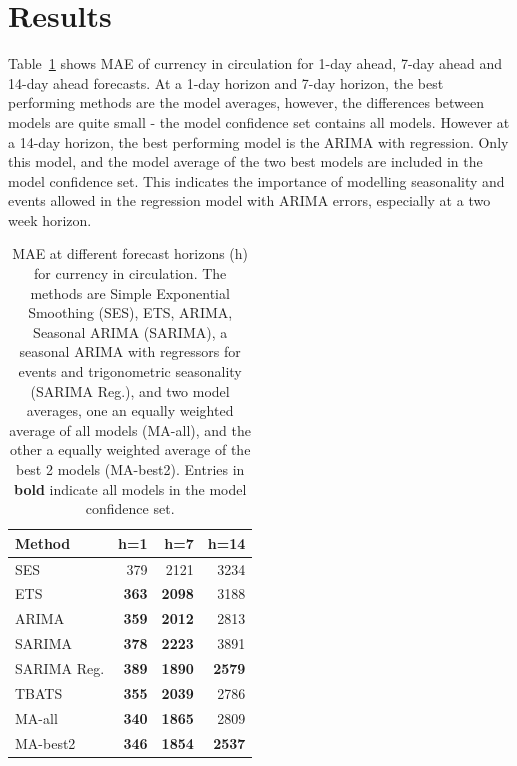 \documentclass{article}
\begin{document}
\section{Results}\label{sec:res}

Table~\ref{tab:cicsum} shows MAE of currency in circulation for 1-day ahead, 7-day ahead and 14-day ahead forecasts. At a 1-day horizon and 7-day horizon, the best performing methods are the model averages, however, the differences between models are quite small - the model confidence set contains all models. However at a 14-day horizon, the best performing model is the ARIMA with regression. Only this model, and the model average of the two best models are included in the model confidence set. This indicates the importance of modelling seasonality and events allowed in the regression model with ARIMA errors, especially at a two week horizon.

\begin{table}[!ht]
\centering
\begin{tabular}{lrrr}
  \hline
Method & h=1 & h=7 & h=14 \\ 
  \hline
SES & 379 & 2121 & 3234 \\ 
  ETS & \textbf{363} & \textbf{2098} & 3188 \\ 
  ARIMA & \textbf{359} & \textbf{2012} & 2813 \\ 
  SARIMA & \textbf{378} & \textbf{2223} & 3891 \\ 
  SARIMA Reg. & \textbf{389} & \textbf{1890} & \textbf{2579} \\ 
  TBATS & \textbf{355} & \textbf{2039} & 2786 \\ 
  MA-all & \textbf{340} & \textbf{1865} & 2809 \\ 
  MA-best2 & \textbf{346} & \textbf{1854} & \textbf{2537} \\ 
   \hline
\end{tabular}
\caption{MAE at different forecast horizons (h) for currency in circulation. The methods are Simple Exponential Smoothing (SES), ETS, ARIMA, Seasonal ARIMA (SARIMA), a seasonal ARIMA with regressors for events and trigonometric seasonality (SARIMA Reg.), and two model averages, one an equally weighted average of all models (MA-all), and the other a equally weighted average of the best 2 models (MA-best2). Entries in \textbf{bold} indicate all models in the model confidence set.} 
\label{tab:cicsum}
\end{table}
\end{document}
